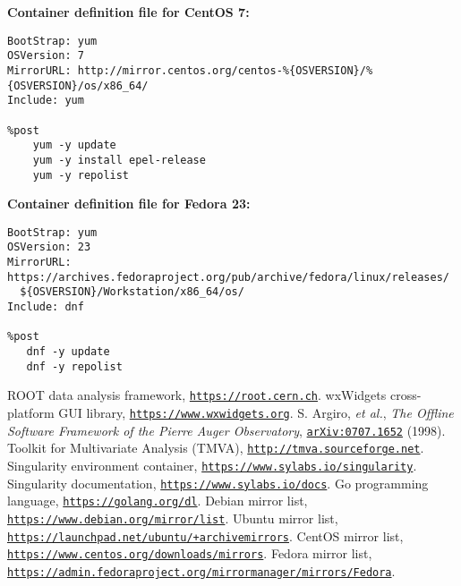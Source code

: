 \documentclass[12pt,a4paper]{report}
\begin{document}
\begin{appendices}
{\noindent}\textbf{Container definition file for CentOS 7:}
\footnotesize
\begin{verbatim}
BootStrap: yum
OSVersion: 7
MirrorURL: http://mirror.centos.org/centos-%{OSVERSION}/%{OSVERSION}/os/x86_64/
Include: yum

%post
	yum -y update
	yum -y install epel-release
	yum -y repolist
\end{verbatim}
\normalsize
{\noindent}\textbf{Container definition file for Fedora 23:}
\footnotesize
\begin{verbatim}
BootStrap: yum
OSVersion: 23
MirrorURL: https://archives.fedoraproject.org/pub/archive/fedora/linux/releases/
  ${OSVERSION}/Workstation/x86_64/os/
Include: dnf

%post
   dnf -y update
   dnf -y repolist
\end{verbatim}
\normalsize

\end{appendices}

\pagebreak
\titleformat{\chapter}[hang]{\normalfont\bf}{}{12pt}{\Large}
\begin{thebibliography}{50} 
\raggedright
{} ROOT data analysis framework, \href{https://root.cern.ch}{\texttt{https://root.cern.ch}}.
 wxWidgets cross-platform GUI library, \href{https://www.wxwidgets.org}{\texttt{https://www.wxwidgets.org}}.
 S. Argiro, \emph{et al.}, \emph{The Offline Software Framework of the Pierre Auger Observatory}, \href{http://arxiv.org/pdf/0707.1652v1.pdf}{\texttt{arXiv:0707.1652}} (1998).
 Toolkit for Multivariate Analysis (TMVA), \href{http://tmva.sourceforge.net}{\texttt{http://tmva.sourceforge.net}}.
 Singularity environment container, \href{https://www.sylabs.io/singularity}{\texttt{https://www.sylabs.io/singularity}}.
 Singularity documentation, \href{https://www.sylabs.io/docs}{\texttt{https://www.sylabs.io/docs}}.
 Go programming language, \href{https://golang.org/dl}{\texttt{https://golang.org/dl}}.
 Debian mirror list, \href{https://www.debian.org/mirror/list}{\texttt{https://www.debian.org/mirror/list}}.
 Ubuntu mirror list, \href{https://launchpad.net/ubuntu/+archivemirrors}{\texttt{https://launchpad.net/ubuntu/+archivemirrors}}.
 CentOS mirror list, \href{https://www.centos.org/downloads/mirrors}{\texttt{https://www.centos.org/downloads/mirrors}}.
 Fedora mirror list, \href{https://admin.fedoraproject.org/mirrormanager/mirrors/Fedora}{\texttt{https://admin.fedoraproject.org/mirrormanager/mirrors/Fedora}}.
\end{thebibliography}
\end{document}
